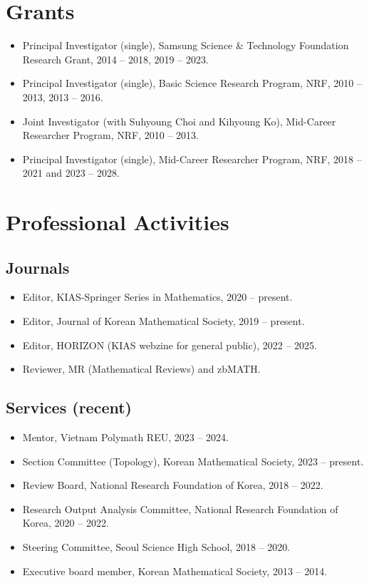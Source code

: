 \documentclass[11pt,a4paper]{article}
\begin{document}
\section*{Grants}
\begin{itemize}[leftmargin=1.5em]
\item Principal Investigator (single), Samsung Science \& Technology Foundation Research Grant, 2014 -- 2018, 2019 -- 2023.
\item Principal Investigator (single), Basic Science Research Program, NRF, 2010 -- 2013, 2013 -- 2016.
\item Joint Investigator (with Suhyoung Choi and Kihyoung Ko), Mid-Career Researcher Program, NRF, 2010 -- 2013.
\item Principal Investigator (single), Mid-Career Researcher Program, NRF, 2018 -- 2021 and 2023 -- 2028.
\end{itemize}

\section*{Professional Activities}
\subsection*{Journals}
\begin{itemize}[leftmargin=1.5em]
\item Editor, KIAS-Springer Series in Mathematics, 2020 -- present.
\item Editor, Journal of Korean Mathematical Society, 2019 -- present.
\item Editor, HORIZON (KIAS webzine for general public), 2022 -- 2025.
\item Reviewer, MR (Mathematical Reviews) and zbMATH.
\end{itemize}

\subsection*{Services (recent)}
\begin{itemize}[leftmargin=1.5em]
\item Mentor, Vietnam Polymath REU, 2023 -- 2024.
\item Section Committee (Topology), Korean Mathematical Society, 2023 -- present.
\item Review Board, National Research Foundation of Korea, 2018 -- 2022.
\item Research Output Analysis Committee, National Research Foundation of Korea, 2020 -- 2022.
\item Steering Committee, Seoul Science High School, 2018 -- 2020.
\item Executive board member, Korean Mathematical Society, 2013 -- 2014.
\end{itemize}
\end{document}
